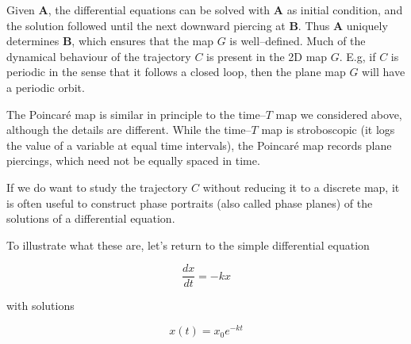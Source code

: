 Given ${\mathbf A}$, the differential equations can be solved with ${\mathbf A}$ as initial condition, and the solution followed until the next downward piercing at ${\mathbf B}$. Thus ${\mathbf A}$ uniquely determines ${\mathbf B}$, which ensures that the map $G$ is well--defined. Much of the dynamical behaviour of the trajectory $C$ is present in the 2D map $G$. E.g, if $C$ is periodic in the sense that it follows a closed loop, then the plane map $G$ will have a periodic orbit.

The Poincar\'{e} map is similar in principle to the time--$T$ map we considered above, although the details are different. While the time--$T$ map is stroboscopic (it logs the value of a variable at equal time intervals), the Poincar\'{e} map records plane piercings, which need not be equally spaced in time.

\pagebreak


If we do want to study the trajectory $C$ without reducing it to a discrete map, it is often useful to construct phase portraits (also called phase planes) of the solutions of a differential equation. 

To illustrate what these are, let's return to the simple differential equation

\begin{equation}
\frac{dx}{dt} = -k x
\end{equation} 

with solutions

\begin{equation}
x(t) = x_0 e^{-kt}
\end{equation} 

